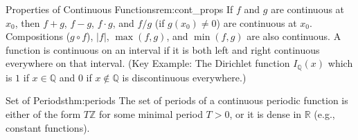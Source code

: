 \documentclass[11pt, a4paper]{article}
\begin{document}
\begin{remark}{Properties of Continuous Functions}{rem:cont_props}
If $f$ and $g$ are continuous at $x_0$, then $f+g$, $f-g$, $f \cdot g$, and $f/g$ (if $g(x_0) \neq 0$) are continuous at $x_0$. Compositions ($g \circ f$), $|f|$, $\max(f,g)$, and $\min(f,g)$ are also continuous. A function is continuous on an interval if it is both left and right continuous everywhere on that interval.
(Key Example: The Dirichlet function $I_{\mathbb{Q}}(x)$ which is $1$ if $x \in \mathbb{Q}$ and $0$ if $x \notin \mathbb{Q}$ is discontinuous everywhere.)
\end{remark}

\begin{theorem}{Set of Periods}{thm:periods}
The set of periods of a continuous periodic function is either of the form $T\mathbb{Z}$ for some minimal period $T > 0$, or it is dense in $\mathbb{R}$ (e.g., constant functions).
\end{theorem}
\end{document}
